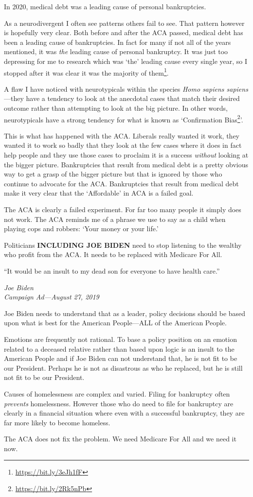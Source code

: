 In 2020, medical debt was a leading cause of personal bankruptcies.

\bigskip

As a neurodivergent I often see patterns others fail to see. That pattern however is hopefully very clear. Both before and after the ACA passed, medical debt has been a leading cause of bankruptcies. In fact for many if not all of the years mentioned, it was \emph{the} leading cause of personal bankruptcy. It was just too depressing for me to research which was `the' leading cause every single year, so I stopped after it was clear it was the majority of them\footnote{\url{https://bit.ly/3eJh1fF}}.

A flaw I have noticed with neurotypicals within the species \textit{Homo sapiens sapiens}---they have a tendency to look at the anecdotal cases that match their desired outcome rather than attempting to look at the big picture. In other words, neurotypicals have a strong tendency for what is known as `Confirmation Bias\footnote{\url{https://bit.ly/2Rk5nPb}}'.

This is what has happened with the ACA. Liberals really wanted it work, they wanted it to work so badly that they look at the few cases where it does in fact help people and they use those cases to proclaim it is a success \emph{without} looking at the bigger picture. Bankruptcies that result from medical debt is a pretty obvious way to get a grasp of the bigger picture but that is ignored by those who continue to advocate for the ACA. Bankruptcies that result from medical debt make it very clear that the `Affordable' in ACA is a failed goal.

The ACA is clearly a failed experiment. For far too many people it simply does not work. The ACA reminds me of a phrase we use to say as a child when playing cops and robbers: `Your money or your life.'

Politicians \textbf{INCLUDING JOE BIDEN} need to stop listening to the wealthy who profit from the ACA. It needs to be replaced with Medicare For All.

\epigraph{``It would be an insult to my dead son for everyone to have health care.''}{\textit{Joe Biden \\ Campaign Ad---August 27, 2019}}

Joe Biden needs to understand that as a leader, policy decisions should be based upon what is best for the American People---ALL of the American People.

Emotions are frequently not rational. To base a policy position on an emotion related to a deceased relative rather than based upon logic is an insult to the American People and if Joe Biden can not understand that, he is not fit to be our President. Perhaps he is not as disastrous as who he replaced, but he is still not fit to be our President.

Causes of homelessness are complex and varied. Filing for bankruptcy often \emph{prevents} homelessness. However those who do need to file for bankruptcy are clearly in a financial situation where even with a successful bankruptcy, they are far more likely to become homeless.

The ACA does not fix the problem. We need Medicare For All and we need it now.
